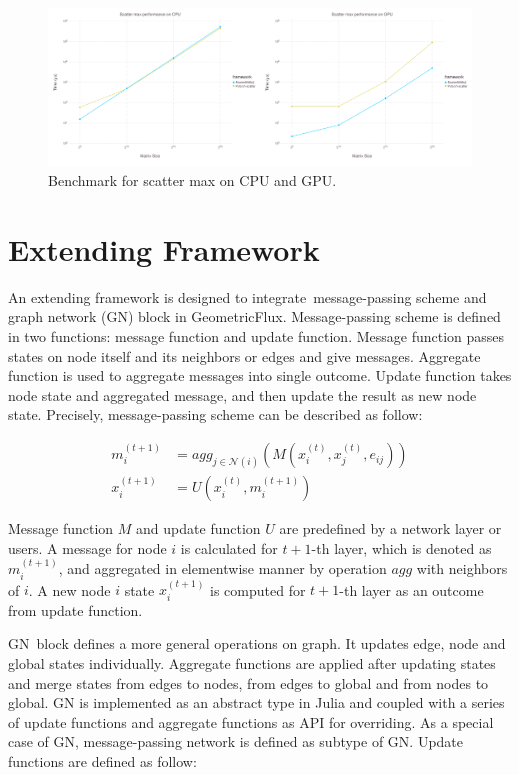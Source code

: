 \documentclass{juliacon}
\begin{document}
\begin{figure}[h]
\centerline{\includegraphics[width=18cm]{figures/scatter_max.svg}}
\caption{Benchmark for scatter max on CPU and GPU.}
    \label{fig:scatter_max}
\end{figure}

\section{Extending Framework}

An extending framework is designed to integrate message-passing scheme and graph network (GN)
block in GeometricFlux. Message-passing scheme is defined in two functions: message function
and update function. Message function passes states on node itself and its neighbors or edges
and give messages. Aggregate function is used to aggregate messages into single outcome.
Update function takes node state and aggregated message, and then update the result as new
node state. Precisely, message-passing scheme can be described as follow:

\[
    \begin{aligned}
    m_i^{(t+1)} &= agg_{j \in \mathcal{N}(i)}(M(x_i^{(t)}, x_j^{(t)}, e_{ij})) \\
    x_i^{(t+1)} &= U(x_i^{(t)}, m_i^{(t+1)})
    \end{aligned}
\]

Message function $M$ and update function $U$ are predefined by a network layer or users.
A message for node $i$ is calculated for $t+1$-th layer, which is denoted as $m_i^{(t+1)}$,
and aggregated in elementwise manner by operation $agg$ with neighbors of $i$. A new node $i$
state $x_i^{(t+1)}$ is computed for $t+1$-th layer as an outcome from update function.

GN block defines a more general operations on graph. It updates edge, node and global states
individually. Aggregate functions are applied after updating states and merge states from edges
to nodes, from edges to global and from nodes to global. GN is implemented as an abstract
type in Julia and coupled with a series of update functions and aggregate functions as API
for overriding. As a special case of GN, message-passing network is defined as subtype of GN.
Update functions are defined as follow:
\end{document}
